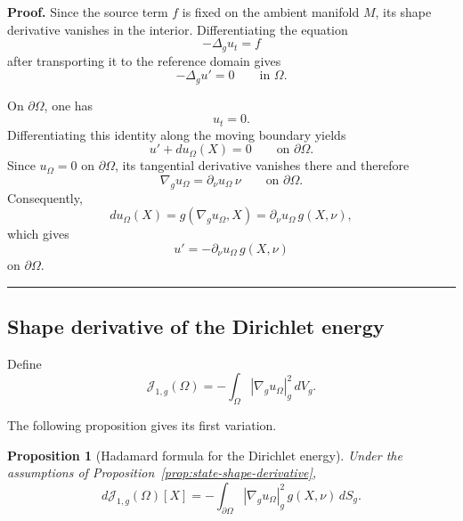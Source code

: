 \documentclass{article}
\renewcommand{\boxed}[1]{#1}
\newtheorem{proposition}[theorem]{Proposition}
\newenvironment{proof}[1][Proof]{\textbf{#1.} }{\ \rule{0.5em}{0.5em}}
\begin{document}
\begin{proof}
Since the source term $f$ is fixed on the ambient manifold $M$, its
shape derivative vanishes in the interior. Differentiating the
equation
\[
-\Delta_g u_t=f
\]
after transporting it to the reference domain gives
\[
-\Delta_g u'=0
\qquad\text{in }\Omega.
\]

On $\partial\Omega$, one has
\[
u_t=0.
\]
Differentiating this identity along the moving boundary yields
\[
u'
+
du_\Omega(X)
=
0
\qquad\text{on }\partial\Omega.
\]
Since $u_\Omega=0$ on $\partial\Omega$, its tangential derivative
vanishes there and therefore
\[
\nabla_g u_\Omega
=
\partial_\nu u_\Omega\,\nu
\qquad\text{on }\partial\Omega.
\]
Consequently,
\[
du_\Omega(X)
=
g(\nabla_g u_\Omega,X)
=
\partial_\nu u_\Omega\,g(X,\nu),
\]
which gives
\[
u'
=
-\partial_\nu u_\Omega\,g(X,\nu)
\]
on $\partial\Omega$.
\end{proof}


\subsection{Shape derivative of the Dirichlet energy}
\label{subsec:energy-shape-derivative}

Define
\begin{equation}
\mathcal J_{1,g}(\Omega)
=
-\int_\Omega|\nabla_g u_\Omega|_g^2\,dV_g.
\label{eq:J1g}
\end{equation}

The following proposition gives its first variation.

\begin{proposition}[Hadamard formula for the Dirichlet energy]
\label{prop:hadamard-energy}
Under the assumptions of
Proposition~\ref{prop:state-shape-derivative},
\begin{equation}
\boxed{
d\mathcal J_{1,g}(\Omega)[X]
=
-\int_{\partial\Omega}
|\nabla_g u_\Omega|_g^2
\,g(X,\nu)\,dS_g.
}
\label{eq:hadamard-energy}
\end{equation}
\end{proposition}
\end{document}

